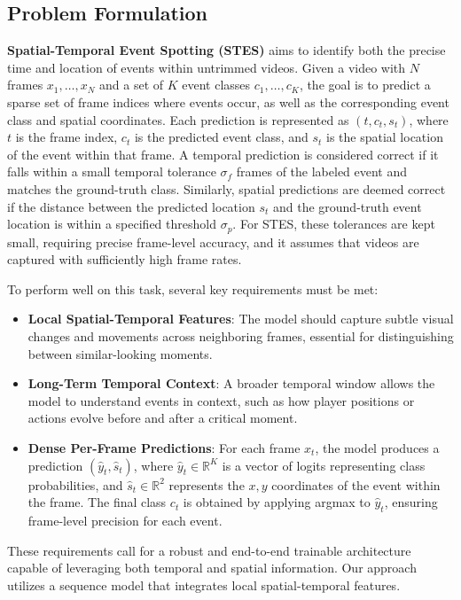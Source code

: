 \documentclass[a4paper,twoside]{article}
\begin{document}
\subsection{Problem Formulation}
\textbf{Spatial-Temporal Event Spotting (STES)} aims to identify both the precise time and location of events within untrimmed videos. Given a video with \(N\) frames \(x_1, \ldots, x_N\) and a set of \(K\) event classes \(c_1, \ldots, c_K\), the goal is to predict a sparse set of frame indices where events occur, as well as the corresponding event class and spatial coordinates. Each prediction is represented as \((t, c_t, s_t)\), where \(t\) is the frame index, \(c_t\) is the predicted event class, and \(s_t\) is the spatial location of the event within that frame. A temporal prediction is considered correct if it falls within a small temporal tolerance \(\sigma_f\) frames of the labeled event and matches the ground-truth class. Similarly, spatial predictions are deemed correct if the distance between the predicted location \(s_t\) and the ground-truth event location is within a specified threshold \(\sigma_p\). For STES, these tolerances are kept small, requiring precise frame-level accuracy, and it assumes that videos are captured with sufficiently high frame rates.

To perform well on this task, several key requirements must be met:
\begin{itemize}
    \item \textbf{Local Spatial-Temporal Features}: The model should capture subtle visual changes and movements across neighboring frames, essential for distinguishing between similar-looking moments.
    \item \textbf{Long-Term Temporal Context}: A broader temporal window allows the model to understand events in context, such as how player positions or actions evolve before and after a critical moment.
    \item \textbf{Dense Per-Frame Predictions}: For each frame \(x_t\), the model produces a prediction \((\hat{y}_t, \hat{s}_t)\), where \(\hat{y}_t \in \mathbb{R}^K\) is a vector of logits representing class probabilities, and \(\hat{s}_t \in \mathbb{R}^2\) represents the \(x, y\) coordinates of the event within the frame. The final class \(c_t\) is obtained by applying argmax to \(\hat{y}_t\), ensuring frame-level precision for each event.
\end{itemize}

These requirements call for a robust and end-to-end trainable architecture capable of leveraging both temporal and spatial information. Our approach utilizes a sequence model that integrates local spatial-temporal features.
\end{document}
